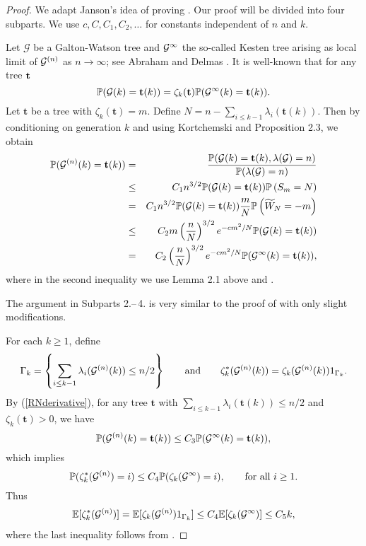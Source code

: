 \documentclass[11pt,a4paper]{article}
\newcommand{\bP}{\mathbb{P}}
\newcommand{\bE}{\mathbb{E}}
\newcommand{\cG}{\mathcal{G}}
\newcommand{\ft}{\mathbf{t}}
\begin{document}
\begin{proof}
We adapt Janson's idea of proving \cite[Theorem 1.13]{Janson06}. Our proof will be divided into four subparts. We use $c,C, C_1, C_2, \ldots$ for constants independent of
$n$ and $k$.

\medskip

 Let $\cG$ be a Galton-Watson tree and ${\cal G}^{\infty}$ the so-called Kesten tree arising as local limit of ${\cal G}^{(n)}$ as $n\rightarrow\infty$; see Abraham and Delmas \cite{AD14}. It is well-known \cite[(1.15)]{Kes86} that for any tree $\bf t$\vspace{-0.2cm}
$$
\bP({\cal G}(k)= \ft(k))=\zeta_k(\ft)\bP({\cal G}^{\infty}(k)=\ft(k)).
$$
Let $\ft$ be a tree with $\zeta_k(\ft)=m$. Define $N=n-\sum_{i\leq k-1}\lambda_i(\ft(k)).$ Then
by conditioning on generation $k$ and using Kortchemski \cite[Theorem 3.1]{Kor12} and Proposition 2.3, we obtain
\begin{eqnarray}
\bP({\cal G}^{(n)}(k)= \ft(k))
&=& \frac{\bP({\cal G}(k)=\ft(k),\lambda({\cal G})=n)}{\bP(\lambda({\cal G})=n)}\nonumber\\
&\leq & C_1n^{3/2} \bP({\cal G}(k)=\ft(k))\bP\left(S_m=N\right)\nonumber\\
&=&C_1n^{3/2} \bP({\cal G}(k)=\ft(k))\frac{m}{N}\bP\left(\widetilde{W}_N=-m\right)\nonumber\\
&\leq&C_2m\left(\frac{n}{N}\right)^{3/2} e^{-cm^2/N}\bP({\cal G}(k)=\ft(k))\nonumber\\
&=&C_2\left(\frac{n}{N}\right)^{3/2} e^{-cm^2/N}\bP({\cal G}^{\infty}(k)=\ft(k)),\label{RNderivative}
\end{eqnarray}
where in the second inequality we use  Lemma  2.1 above and \cite[Lemma 2.1]{Janson06}.

\medskip
The argument in Subparts 2.--\,4. is very similar to the proof of \cite[Theorem 1.13]{Janson06} with only slight modifications.

\medskip

For each $k\geq1$, define
$$
\Gamma_k=\left\{\sum_{i\le k-1}\lambda_i({\cal G}^{(n)}(k))\leq n/2 \right\}\qquad\mbox{and}\qquad
{\zeta}_k^*({\cal G}^{(n)}(k))={\zeta}_k({\cal G}^{(n)}(k))1_{\Gamma_k}.
$$
By (\ref{RNderivative}),  for any tree $\ft$ with $\sum_{i\le k-1}\lambda_i(\ft(k))\leq n/2$ and $ \zeta_k(\ft)>0$,
we have $$\bP({\cal G}^{(n)}(k)= \ft(k))
\leq C_3\bP({\cal G}^{\infty}(k)=\ft(k)),$$
which implies
$$
\bP({\zeta}_k^*({\cal G}^{(n)})=i)
\leq C_4\bP(\zeta_k({\cal G}^{\infty})=i),\qquad \mbox{for all }i\geq1.
$$
Thus
\begin{eqnarray}\label{bounda}
\bE[ {\zeta}_k^*({\cal G}^{(n)})]=\bE[ \zeta_k({\cal G}^{(n)})1_{\Gamma_k}]\leq C_4 \bE[ \zeta_k({\cal G}^{\infty})]\leq C_5k,
\end{eqnarray}
where the last inequality follows from \cite[Lemma 2.3]{Janson06}.


\end{proof}
\end{document}
